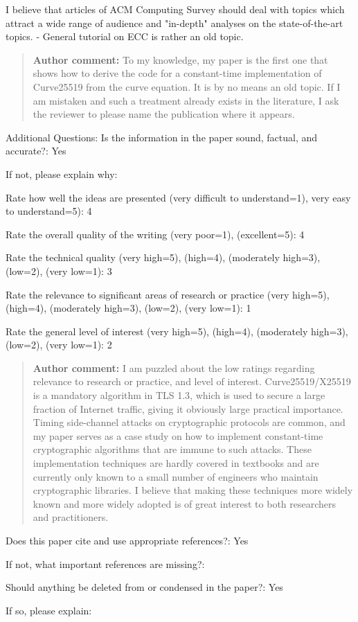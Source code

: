 \documentclass[10pt]{article}
\newcommand{\authorcomment}[1]{\begin{quote}\textbf{Author comment:} #1\end{quote}}
\begin{document}
\begin{spverbatim}
I believe that articles of ACM Computing Survey should deal with topics which attract a wide range of audience and "in-depth" analyses on the state-of-the-art topics. - General tutorial on ECC is rather an old topic.
\end{spverbatim}
\authorcomment{To my knowledge, my paper is the first one that shows how to derive the code for a constant-time implementation of Curve25519 from the curve equation.
It is by no means an old topic.
If I am mistaken and such a treatment already exists in the literature, I ask the reviewer to please name the publication where it appears.}
\begin{spverbatim}
Additional Questions:
Is the information in the paper sound, factual, and accurate?: Yes

If not, please explain why: 

Rate how well the ideas are presented (very difficult to understand=1), very easy to understand=5): 4

Rate the overall quality of the writing (very poor=1), (excellent=5): 4

Rate the technical quality (very high=5), (high=4), (moderately high=3), (low=2), (very low=1): 3

Rate the relevance to significant areas of research or practice (very high=5), (high=4), (moderately high=3), (low=2), (very low=1): 1

Rate the general level of interest (very high=5), (high=4), (moderately high=3), (low=2), (very low=1): 2
\end{spverbatim}
\authorcomment{I am puzzled about the low ratings regarding relevance to research or practice, and level of interest.
Curve25519/X25519 is a mandatory algorithm in TLS 1.3, which is used to secure a large fraction of Internet traffic, giving it obviously large practical importance.
Timing side-channel attacks on cryptographic protocols are common, and my paper serves as a case study on how to implement constant-time cryptographic algorithms that are immune to such attacks.
These implementation techniques are hardly covered in textbooks and are currently only known to a small number of engineers who maintain cryptographic libraries.
I believe that making these techniques more widely known and more widely adopted is of great interest to both researchers and practitioners.}
\begin{spverbatim}
Does this paper cite and use appropriate references?: Yes

If not, what important references are missing?: 

Should anything be deleted from or condensed in the paper?: Yes

If so, please explain: 

\end{spverbatim}
\end{document}
